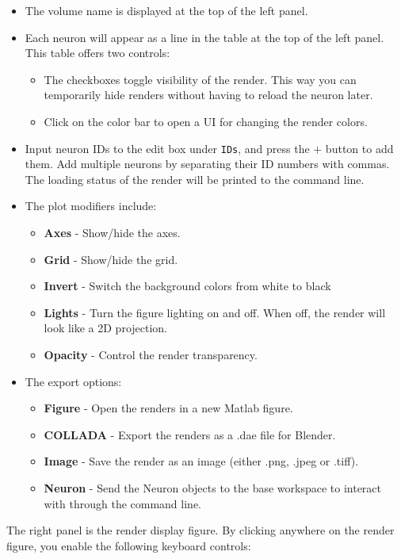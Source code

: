 \documentclass[12pt]{exam}
\begin{document}
	\begin{itemize}
		\item The volume name is displayed at the top of the left panel.
		\item Each neuron will appear as a line in the table at the top of the left panel. This table offers two controls:
		\begin{itemize}
			\item The checkboxes toggle visibility of the render. This way you can temporarily hide renders without having to reload the neuron later.
			\item Click on the color bar to open a UI for changing the render colors.
		\end{itemize}
		\item Input neuron IDs to the edit box under \texttt{IDs}, and press the \texttt{$+$} button to add them. Add multiple neurons by separating their ID numbers with commas. The loading status of the render will be printed to the command line.
		\item The plot modifiers include:
		\begin{itemize}
			\item \textbf{Axes} - Show/hide the axes.
			\item \textbf{Grid} - Show/hide the grid.
			\item \textbf{Invert} - Switch the background colors from white to black
			\item \textbf{Lights} - Turn the figure lighting on and off. When off, the render will look like a 2D projection.
			\item \textbf{Opacity} - Control the render transparency.
		\end{itemize}
		\item The export options:
		\begin{itemize}
			\item \textbf{Figure} - Open the renders in a new Matlab figure.
			\item \textbf{COLLADA} - Export the renders as a .dae file for Blender.
			\item \textbf{Image} - Save the render as an image (either .png, .jpeg or .tiff).
			\item \textbf{Neuron} - Send the Neuron objects to the base workspace to interact with through the command line.
		\end{itemize}
	\end{itemize}
	The right panel is the render display figure. By clicking anywhere on the render figure, you enable the following keyboard controls:\\
\end{document}
